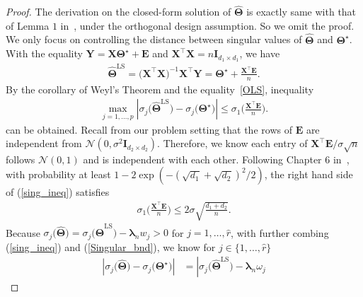 \documentclass[alpha-refs]{wiley-article}
\begin{document}
\begin{proof}
The derivation on the closed-form solution of $\widehat{\boldsymbol{\Theta}}$ is exactly same with that of Lemma $1$ in~\citet{yuan2007dimension}, under the orthogonal design assumption.
So we omit the proof. 
We only focus on controlling the distance between singular values of $\widehat{\boldsymbol{\Theta}}$ and $\boldsymbol{\Theta}^{\star}$. 
With the equality $\boldsymbol{Y}=\boldsymbol{X}\boldsymbol{\Theta}^{\star}+\boldsymbol{E}$ and $\boldsymbol{X}^{\top}\boldsymbol{X}=n\boldsymbol{I}_{d_{1} \times d_{1}}$, we have
\begin{align} \label{OLS}
    \widehat{\boldsymbol{\Theta}}^{\text{LS}}=\big(\boldsymbol{X}^{\top}\boldsymbol{X}\big)^{-1}\boldsymbol{X}^{\top}\boldsymbol{Y} = \boldsymbol{\Theta^\star} + \frac{\boldsymbol{X}^{\top}\boldsymbol{E}}{n}.
\end{align}
By the corollary of Weyl's Theorem and the equality~\eqref{OLS}, inequality
\begin{align} \label{sing_ineq}
    \max_{j=1,\dots,p}\left| \sigma_{j}\big(\widehat{\boldsymbol{\Theta}}^{\text{LS}}\big) - \sigma_{j}\big(\boldsymbol{\Theta^\star}\big) \right|
    \leq \sigma_{1}\bigg( \frac{\boldsymbol{X}^{\top}\boldsymbol{E}}{n} \bigg).
\end{align}
can be obtained. Recall from our problem setting that the rows of $\boldsymbol{E}$ are independent from $\mathcal{N}(0,\sigma^{2}\boldsymbol{I}_{d_{2} \times d_{2}})$.
Therefore, we know each entry of $\boldsymbol{X}^{\top}\boldsymbol{E}/\sigma\sqrt{n}$ follows $\mathcal{N}(0,1)$ and is independent with each other.
Following Chapter $6$ in~\cite{wainwright2019high}, 
with probability at least $1-2\exp(-(\sqrt{d_{1}}+\sqrt{d_{2}})^{2}/2)$, the right hand side of (\ref{sing_ineq}) satisfies 
\begin{align} \label{Singular_bnd}
    \sigma_{1}\bigg( \frac{\boldsymbol{X}^{\top}\boldsymbol{E}}{n} \bigg) \leq 2\sigma \sqrt{\frac{d_{1}+d_{2}}{n}} .
\end{align}
Because $\sigma_{j}\big(\widehat{\boldsymbol{\Theta}}\big) = \sigma_{j}\big(\widehat{\boldsymbol{\Theta}}^{\text{LS}}\big)-\boldsymbol{\lambda}_{n} w_{j}>0$ for $j=1,\dots,\widehat{r}$, with further combing (\ref{sing_ineq}) and (\ref{Singular_bnd}), we know  for $j\in\{1,\dots,\widehat{r}\}$
\begin{align}
    \left| \sigma_{j}\big(\widehat{\boldsymbol{\Theta}}\big)-\sigma_{j}\big(\boldsymbol{\Theta}^{\star}\big)\right|
    &= \left|\sigma_{j}\big(\widehat{\boldsymbol{\Theta}}^{\text{LS}}\big)-\boldsymbol{\lambda}_{n}\omega_{j}

\end{align}
\end{proof}
\end{document}
